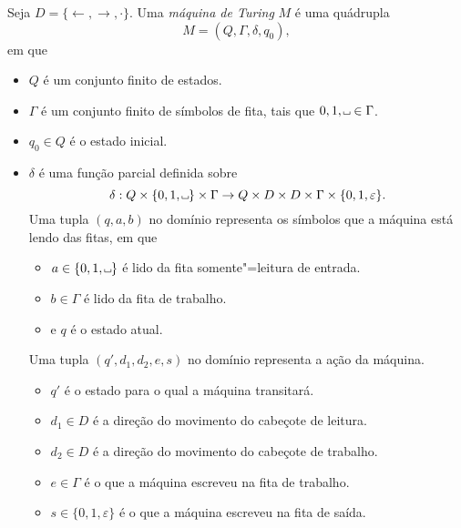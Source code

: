 \begin{definition}
    Seja $D = \{\leftarrow, \rightarrow, \cdot\}$.
    Uma \emph{máquina de Turing} $M$ é uma quádrupla
    \begin{equation*}
        M = (Q, \Gamma, \delta, q_0),
    \end{equation*}
    em que
    \begin{itemize}
        \setlength{\labelsep}{1ex}
        \item $Q$ é um conjunto finito de estados.
        \item $\Gamma$ é um conjunto finito de símbolos de fita,
            tais que $0, 1, \B \in \Gamma$.
        \item $q_0 \in Q$ é o estado inicial.
        \item $\delta$ é uma função parcial definida sobre
            \begin{equation*}
                \delta: Q \times \{0, 1, \B\} \times \Gamma
                    \to Q \times D \times D \times \Gamma \times \{0, 1, \varepsilon\}.
            \end{equation*}
            Uma tupla $(q, a, b)$ no domínio
            representa os símbolos que a máquina está lendo das fitas,
            em que
            \begin{itemize}
                \item $a \in \{0, 1, \B\}$ é lido da fita somente"=leitura de entrada.
                \item $b \in \Gamma$ é lido da fita de trabalho.
                \item e $q$ é o estado atual.
            \end{itemize}
            Uma tupla $(q', d_1, d_2, e, s)$ no domínio representa a ação da máquina.
            \begin{itemize}
                \item $q'$ é o estado para o qual a máquina transitará.
                \item $d_1 \in D$ é a direção do movimento do cabeçote de leitura.
                \item $d_2 \in D$ é a direção do movimento do cabeçote de trabalho.
                \item $e \in \Gamma$ é o que a máquina escreveu na fita de trabalho.
                \item $s \in \{0, 1, \varepsilon\}$ é o que a máquina escreveu
                    na fita de saída.
            \end{itemize}
    \end{itemize}
\end{definition}

